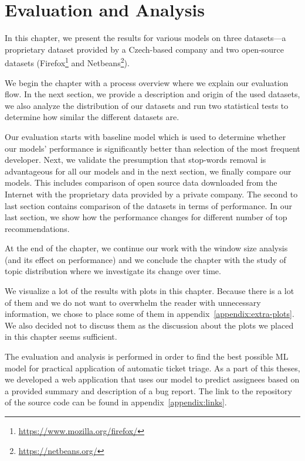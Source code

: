 \chapter{Evaluation and Analysis}
\label{chapter:evaluation}

In this chapter, we present the results for various models on three datasets---a proprietary dataset provided by a Czech-based company and two open-source datasets (Firefox\footnote{\url{https://www.mozilla.org/firefox/}} and Netbeans\footnote{\url{https://netbeans.org/}}).

We begin the chapter with a process overview where we explain our evaluation flow. In the next section, we provide a description and origin of the used datasets, we also analyze the distribution of our datasets and run two statistical tests to determine how similar the different datasets are.

Our evaluation starts with baseline model which is used to determine whether our models' performance is significantly better than selection of the most frequent developer. Next, we validate the presumption that stop-words removal is advantageous for all our models and in the next section, we finally compare our models. This includes comparison of open source data downloaded from the Internet with the proprietary data provided by a private company. The second to last section contains comparison of the datasets in terms of performance. In our last section, we show how the performance changes for different number of top recommendations.

At the end of the chapter, we continue our work with the window size analysis (and its effect on performance) and we conclude the chapter with the study of topic distribution where we investigate its change over time.

We visualize a lot of the results with plots in this chapter. Because there is a lot of them and we do not want to overwhelm the reader with unnecessary information, we chose to place some of them in appendix~\ref{appendix:extra-plots}. We also decided not to discuss them as the discussion about the plots we placed in this chapter seems sufficient.

The evaluation and analysis is performed in order to find the best possible ML model for practical application of automatic ticket triage. As a part of this theses, we developed a web application that uses our model to predict assignees based on a provided summary and description of a bug report. The link to the repository of the source code can be found in appendix~\ref{appendix:links}.

